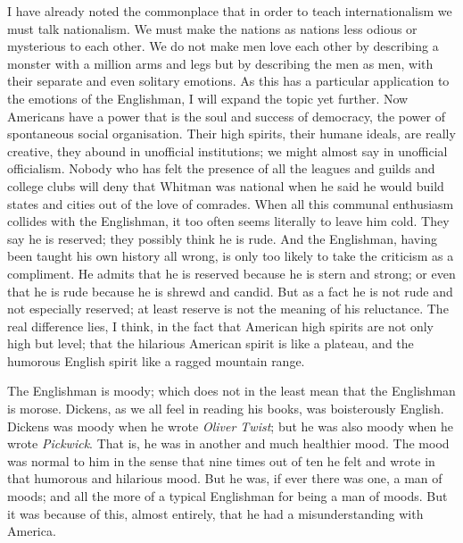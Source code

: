 \documentclass{book}
\begin{document}
I have already noted the commonplace that in order to teach internationalism we must talk nationalism. We must make the nations as nations less odious or mysterious to each other. We do not make men love each other by describing a monster with a million arms and legs but by describing the men as men, with their separate and even solitary emotions. As this has a particular application to the emotions of the Englishman, I will expand the topic yet further. Now Americans have a power that is the soul and success of democracy, the power of spontaneous social organisation. Their high spirits, their humane ideals, are really creative, they abound in unofficial institutions; we might almost say in unofficial officialism. Nobody who has felt the presence of all the leagues and guilds and college clubs will deny that Whitman was national when he said he would build states and cities out of the love of comrades. When all this communal enthusiasm collides with the Englishman, it too often seems literally to leave him cold. They say he is reserved; they possibly think he is rude. And the Englishman, having been taught his own history all wrong, is only too likely to take the criticism as a compliment. He admits that he is reserved because he is stern and strong; or even that he is rude because he is shrewd and candid. But as a fact he is not rude and not especially reserved; at least reserve is not the meaning of his reluctance. The real difference lies, I think, in the fact that American high spirits are not only high but level; that the hilarious American spirit is like a plateau, and the humorous English spirit like a ragged mountain range.

The Englishman is moody; which does not in the least mean that the Englishman is morose. Dickens, as we all feel in reading his books, was boisterously English. Dickens was moody when he wrote \emph{Oliver Twist}; but he was also moody when he wrote \emph{Pickwick}. That is, he was in another and much healthier mood. The mood was normal to him in the sense that nine times out of ten he felt and wrote in that humorous and hilarious mood. But he was, if ever there was one, a man of moods; and all the more of a typical Englishman for being a man of moods. But it was because of this, almost entirely, that he had a misunderstanding with America.
\end{document}
